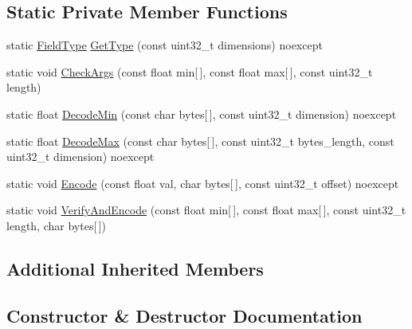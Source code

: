 \subsection*{Static Private Member Functions}
\begin{DoxyCompactItemize}
\item 
static \mbox{\hyperlink{classlucene_1_1core_1_1document_1_1FieldType}{Field\+Type}} \mbox{\hyperlink{classlucene_1_1core_1_1document_1_1FloatRange_ac04a6921c3fe17a684863f0b539c0cc9}{Get\+Type}} (const uint32\+\_\+t dimensions) noexcept
\item 
static void \mbox{\hyperlink{classlucene_1_1core_1_1document_1_1FloatRange_a98e6d50006fd55567e23c446057a8b4a}{Check\+Args}} (const float min\mbox{[}$\,$\mbox{]}, const float max\mbox{[}$\,$\mbox{]}, const uint32\+\_\+t length)
\item 
static float \mbox{\hyperlink{classlucene_1_1core_1_1document_1_1FloatRange_a8b52adb68b6c046ed19a775223ff06bf}{Decode\+Min}} (const char bytes\mbox{[}$\,$\mbox{]}, const uint32\+\_\+t dimension) noexcept
\item 
static float \mbox{\hyperlink{classlucene_1_1core_1_1document_1_1FloatRange_a0adcc9ba52f9818b12f34abdb7d9a47f}{Decode\+Max}} (const char bytes\mbox{[}$\,$\mbox{]}, const uint32\+\_\+t bytes\+\_\+length, const uint32\+\_\+t dimension) noexcept
\item 
static void \mbox{\hyperlink{classlucene_1_1core_1_1document_1_1FloatRange_a7ae1d5511c0454db48cf70e7d872470e}{Encode}} (const float val, char bytes\mbox{[}$\,$\mbox{]}, const uint32\+\_\+t offset) noexcept
\item 
static void \mbox{\hyperlink{classlucene_1_1core_1_1document_1_1FloatRange_aa0179c3af6585d4e262298013d543093}{Verify\+And\+Encode}} (const float min\mbox{[}$\,$\mbox{]}, const float max\mbox{[}$\,$\mbox{]}, const uint32\+\_\+t length, char bytes\mbox{[}$\,$\mbox{]})
\end{DoxyCompactItemize}
\subsection*{Additional Inherited Members}


\subsection{Constructor \& Destructor Documentation}
\mbox{\label{classlucene_1_1core_1_1document_1_1FloatRange_a69d45b11fa82af7396120419ece24be4}} 
